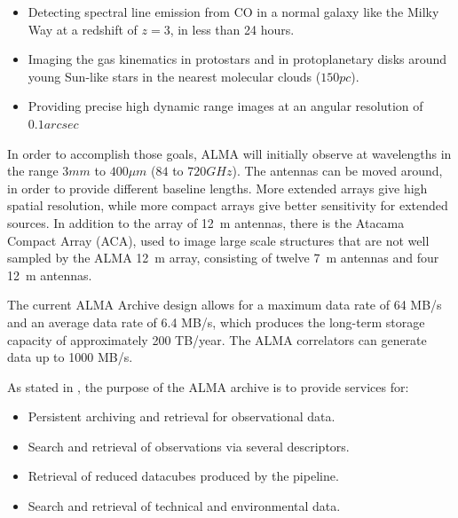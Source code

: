 \begin{itemize}

\item Detecting spectral line emission from CO in a normal galaxy like the Milky Way at a redshift of $z=3$, in less than 24 hours.

\item Imaging the gas kinematics in protostars and in protoplanetary disks around young Sun-like stars in the nearest molecular clouds ($150 pc$).

\item Providing precise high dynamic range images at an angular resolution of $0.1 arcsec$
\end{itemize}

In order to accomplish those goals,
ALMA will initially 
observe at wavelengths in the range $3 mm$ to
$400 \mu{}m$
($84$ to $720 GHz$). The antennas can be moved around, in order to
provide different %
baseline lengths. More extended arrays
give high spatial resolution,
while
more compact arrays give better sensitivity for extended sources. In addition to the array of
12~m
antennas, there is the Atacama Compact Array (ACA), used to image large scale structures that are not well sampled by the ALMA
12~m
array, consisting of twelve
7~m
antennas and four
12~m
antennas. 


The current ALMA Archive design allows for a maximum data rate of 64 MB/s and an average data rate
of 6.4 MB/s, which produces the long-term storage capacity of approximately 200 TB/year. The
ALMA correlators can
generate %
data
up to 1000 MB/s. 

 
As stated in \cite{Etoka12}, the purpose of the ALMA archive is to provide services for:

\begin{itemize}

\item Persistent archiving and retrieval for observational data.

\item Search and retrieval of observations via several descriptors. %

\item Retrieval of reduced datacubes
produced by
the
pipeline.

\item Search and retrieval of technical and environmental data. %
\end{itemize}

